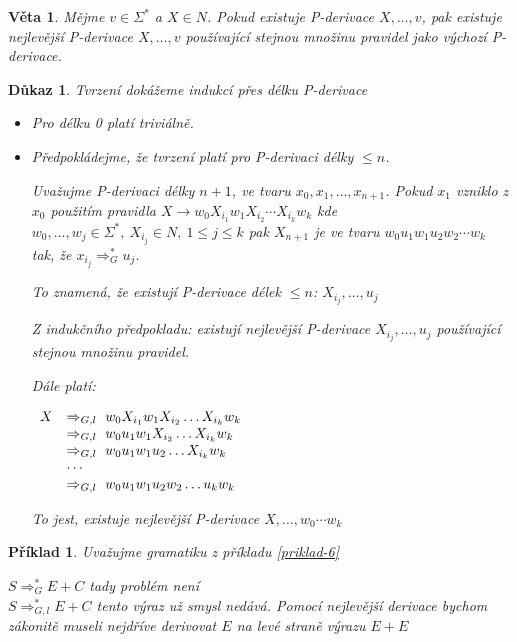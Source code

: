 \documentclass[10pt, a4paper, titlepage]{article}
\theoremstyle{note}
\newtheorem{dukaz}{Důkaz}
\newtheorem{veta}{Věta}
\newtheorem{priklad}{Příklad}
\begin{document}
\begin{veta}
Mějme $v \in \Sigma^*$ a $X \in N$. Pokud existuje P-derivace $X,\ldots,v$, pak existuje nejlevější P-derivace $X,\ldots,v$ používající stejnou množinu pravidel jako výchozí P-derivace.
\end{veta}
\begin{dukaz}
Tvrzení dokážeme indukcí přes délku P-derivace
\begin{itemize}
\item
Pro délku 0 platí triviálně.
\item
Předpokládejme, že tvrzení platí pro P-derivaci délky $\le n$.

Uvažujme P-derivaci délky $n+1$, ve tvaru $x_0,x_1,\ldots,x_{n+1}$. Pokud $x_1$ vzniklo z $x_0$ použitím pravidla $X \rightarrow w_0X_{i_1}w_1X_{i_2} \cdots X_{i_k}w_k$ kde $w_0,\ldots,w_j \in \Sigma^*,\ X_{i_j} \in N,\ 1 \le j\le k$ pak $X_{n+1}$ je ve tvaru $w_0u_1w_1u_2w_2 \cdots w_k$ tak, že $x_{i_j} \Rightarrow_G^* u_j$.

To znamená, že existují P-derivace délek $\le n$: $X_{i_j},\ldots,u_j$

Z indukčního předpokladu: existují nejlevější P-derivace $X_{i_j},\ldots,u_j$ používající stejnou množinu pravidel.

Dále platí: 

$
\begin{array}{l l}
X & \Rightarrow_{G,l}\  w_0X_{i_1}w_1X_{i_2} \ldots X_{i_k}w_k \\
& \Rightarrow_{G,l}\  w_0u_1w_1X_{i_2} \ldots X_{i_k}w_k \\
& \Rightarrow_{G,l}\  w_0u_1w_1u_2 \ldots X_{i_k}w_k \\
& \cdots \\
& \Rightarrow_{G,l}\  w_0u_1w_1u_2w_2 \ldots u_kw_k
\end{array}
$

To jest, existuje nejlevější P-derivace $X,\ldots,w_0 \cdots w_k$
\end{itemize}
\end{dukaz}

\begin{priklad}
Uvažujme gramatiku z příkladu \ref{priklad-6}

$S \Rightarrow_G^* E+C$ tady problém není\\
$S \Rightarrow_{G,l}^* E+C$ tento výraz už smysl nedává. Pomocí nejlevější derivace bychom zákonitě museli nejdříve derivovat $E$ na levé straně výrazu $E+E$
\end{priklad}
\end{document}
